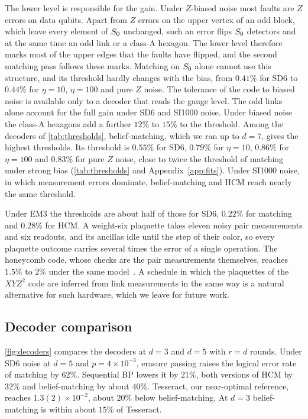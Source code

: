 The lower level is responsible for the gain. Under $Z$-biased noise most faults are $Z$ errors on data qubits. Apart from $Z$ errors on the upper vertex of an odd block, which leave every element of $S_0$ unchanged, such an error flips $S_0$ detectors and at the same time an odd link or a class-A hexagon. The lower level therefore marks most of the upper edges that the faults have flipped, and the second matching pass follows these marks. Matching on $S_0$ alone cannot use this structure, and its threshold hardly changes with the bias, from $0.41\%$ for SD6 to $0.44\%$ for $\eta=10$, $\eta=100$ and pure $Z$ noise. The tolerance of the code to biased noise is available only to a decoder that reads the gauge level. The odd links alone account for the full gain under SD6 and SI1000 noise. Under biased noise the class-A hexagons add a further $12\%$ to $15\%$ to the threshold. Among the decoders of \autoref{tab:thresholds}, belief-matching, which we ran up to $d=7$, gives the highest thresholds. Its threshold is $0.55\%$ for SD6, $0.79\%$ for $\eta=10$, $0.86\%$ for $\eta=100$ and $0.83\%$ for pure $Z$ noise, close to twice the threshold of matching under strong bias (\autoref{tab:thresholds} and Appendix~\ref{app:fits}). Under SI1000 noise, in which measurement errors dominate, belief-matching and HCM reach nearly the same threshold.

Under EM3 the thresholds are about half of those for SD6, $0.22\%$ for matching and $0.28\%$ for HCM. A weight-six plaquette takes eleven noisy pair measurements and six readouts, and its ancillas idle until the step of their color, so every plaquette outcome carries several times the error of a single operation. The honeycomb code, whose checks are the pair measurements themselves, reaches $1.5\%$ to $2\%$ under the same model~\cite{gidney2021honeycomb}. A schedule in which the plaquettes of the $XYZ^2$ code are inferred from link measurements in the same way is a natural alternative for such hardware, which we leave for future work.

\subsection{Decoder comparison}
\label{sec:decoder_comparison}

\autoref{fig:decoders} compares the decoders at $d=3$ and $d=5$ with $r=d$ rounds. Under SD6 noise at $d=5$ and $p=4\times10^{-3}$, erasure passing raises the logical error rate of matching by $62\%$. Sequential BP lowers it by $21\%$, both versions of HCM by $32\%$ and belief-matching by about $40\%$. Tesseract, our near-optimal reference, reaches $1.3(2)\times10^{-2}$, about $20\%$ below belief-matching. At $d=3$ belief-matching is within about $15\%$ of Tesseract.

